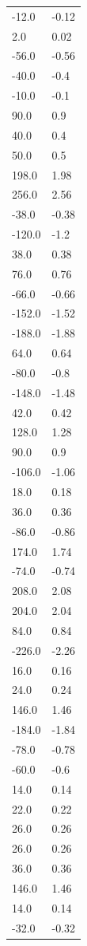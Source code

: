 \begin{longtable}{ll}
-12.0 & -0.12 \\
2.0 & 0.02 \\
-56.0 & -0.56 \\
-40.0 & -0.4 \\
-10.0 & -0.1 \\
90.0 & 0.9 \\
40.0 & 0.4 \\
50.0 & 0.5 \\
198.0 & 1.98 \\
256.0 & 2.56 \\
-38.0 & -0.38 \\
-120.0 & -1.2 \\
38.0 & 0.38 \\
76.0 & 0.76 \\
-66.0 & -0.66 \\
-152.0 & -1.52 \\
-188.0 & -1.88 \\
64.0 & 0.64 \\
-80.0 & -0.8 \\
-148.0 & -1.48 \\
42.0 & 0.42 \\
128.0 & 1.28 \\
90.0 & 0.9 \\
-106.0 & -1.06 \\
18.0 & 0.18 \\
36.0 & 0.36 \\
-86.0 & -0.86 \\
174.0 & 1.74 \\
-74.0 & -0.74 \\
208.0 & 2.08 \\
204.0 & 2.04 \\
84.0 & 0.84 \\
-226.0 & -2.26 \\
16.0 & 0.16 \\
24.0 & 0.24 \\
146.0 & 1.46 \\
-184.0 & -1.84 \\
-78.0 & -0.78 \\
-60.0 & -0.6 \\
14.0 & 0.14 \\
22.0 & 0.22 \\
26.0 & 0.26 \\
26.0 & 0.26 \\
36.0 & 0.36 \\
146.0 & 1.46 \\
14.0 & 0.14 \\
-32.0 & -0.32 \\

\end{longtable}
